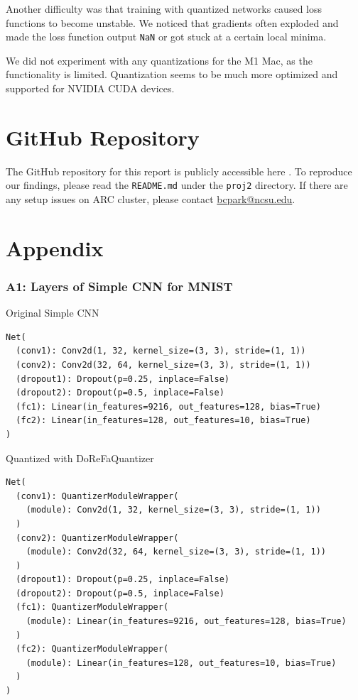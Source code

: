 \documentclass{article}
\begin{document}
Another difficulty was that training with quantized networks caused loss functions to become unstable. We noticed that gradients often exploded and made the loss function output \verb|NaN| or got stuck at a certain local minima.

We did not experiment with any quantizations for the M1 Mac, as the functionality is limited. Quantization seems to be much more optimized and supported for NVIDIA CUDA devices. 

\section{GitHub Repository}
The GitHub repository for this report is publicly accessible here \cite{proj2-repo}. To reproduce our findings, please read the \verb|README.md| under the \verb|proj2| directory. If there are any setup issues on ARC cluster, please contact \href{mailto:bcpark@ncsu.edu}{bcpark@ncsu.edu}.





\section{Appendix}

\subsubsection{A1: Layers of Simple CNN for MNIST}
\label{sec:A1}
Original Simple CNN
\begin{verbatim}
Net(
  (conv1): Conv2d(1, 32, kernel_size=(3, 3), stride=(1, 1))
  (conv2): Conv2d(32, 64, kernel_size=(3, 3), stride=(1, 1))
  (dropout1): Dropout(p=0.25, inplace=False)
  (dropout2): Dropout(p=0.5, inplace=False)
  (fc1): Linear(in_features=9216, out_features=128, bias=True)
  (fc2): Linear(in_features=128, out_features=10, bias=True)
)
\end{verbatim}

Quantized with DoReFaQuantizer
\begin{verbatim}
Net(
  (conv1): QuantizerModuleWrapper(
    (module): Conv2d(1, 32, kernel_size=(3, 3), stride=(1, 1))
  )
  (conv2): QuantizerModuleWrapper(
    (module): Conv2d(32, 64, kernel_size=(3, 3), stride=(1, 1))
  )
  (dropout1): Dropout(p=0.25, inplace=False)
  (dropout2): Dropout(p=0.5, inplace=False)
  (fc1): QuantizerModuleWrapper(
    (module): Linear(in_features=9216, out_features=128, bias=True)
  )
  (fc2): QuantizerModuleWrapper(
    (module): Linear(in_features=128, out_features=10, bias=True)
  )
)
\end{verbatim}
\end{document}
